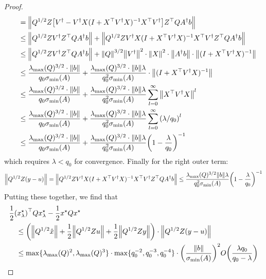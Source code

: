 \documentclass[12pt]{article}
\begin{document}
\begin{proof}
\begin{align*}
      &\quad= {\left\lVert Q^{1/2} Z
          {\left[V^\dagger
            - V^\dagger X(I + X^\top V^\dagger X)^{-1} X^\top V^\dagger\right]}
          Z^\top Q A^\dagger b\right\rVert} \\
      &\quad\leq {\left\lVert Q^{1/2} Z V ^\dagger Z^\top Q A^\dagger b\right\rVert}
        + {\left\lVert Q^{1/2} Z V^\dagger X
          (I + X^\top V^\dagger X)^{-1} X^\top V^\dagger
          Z^\top Q A^\dagger b\right\rVert} \\
      &\quad\leq {\left\lVert Q^{1/2} Z V ^\dagger Z^\top Q A^\dagger b\right\rVert}
        + {\left\lVert Q\right\rVert}^{3/2} {\left\lVert V^\dagger\right\rVert}^2 \cdot {\left\lVert X\right\rVert}^2
          \cdot {\left\lVert A^\dagger b\right\rVert}
          \cdot {\left\lVert(I + X^\top V^\dagger X)^{-1}\right\rVert} \\
      &\quad\leq
        \frac{\lambda_{\max} (Q)^{3/2} \cdot {\left\lVert b\right\rVert}}{q_0 \sigma_{\min} (A)}
        + \frac{\lambda_{\max} (Q)^{3/2} \cdot {\left\lVert b\right\rVert} \lambda}
                {q_0 ^2 \sigma_{\min} (A)}
        \cdot {\left\lVert(I + X^\top V^\dagger X)^{-1}\right\rVert} \\
      &\quad\leq
        \frac{\lambda_{\max} (Q)^{3/2} \cdot {\left\lVert b\right\rVert}}{q_0 \sigma_{\min} (A)}
        + \frac{\lambda_{\max} (Q)^{3/2} \cdot {\left\lVert b\right\rVert} \lambda}
                {q_0 ^2 \sigma_{\min} (A)}
          \sum_{l = 0}^{\infty} {\left\lVert X^\top V^\dagger X\right\rVert}^l \\
      &\quad\leq
        \frac{\lambda_{\max} (Q)^{3/2} \cdot {\left\lVert b\right\rVert}}{q_0 \sigma_{\min} (A)}
        + \frac{\lambda_{\max} (Q)^{3/2} \cdot {\left\lVert b\right\rVert} \lambda}
                {q_0 ^2 \sigma_{\min} (A)}
          \sum_{l = 0}^{\infty} {\left(\lambda / q_0\right)}^l \\
      &\quad\leq
        \frac{\lambda_{\max} (Q)^{3/2} \cdot {\left\lVert b\right\rVert}}{q_0 \sigma_{\min} (A)}
        + \frac{\lambda_{\max} (Q)^{3/2} \cdot {\left\lVert b\right\rVert} \lambda}
                {q_0 ^2 \sigma_{\min} (A)}
            {\left(1 - \frac{\lambda}{q_0}\right)}^{-1}
  \end{align*}
  which requires \(\lambda < q_0\) for convergence.
  Finally for the right outer term:
  \begin{align*}
    {\left\lVert Q^{1/2} Z (y - u)\right\rVert}
      = {\left\lVert Q^{1/2} Z V^\dagger X
        (I + X^\top V^\dagger X)^{-1} X^\top V^\dagger Z^\top Q A ^\dagger b\right\rVert}
      \leq \frac{\lambda_{\max} (Q)^{3/2} {\left\lVert b\right\rVert} \lambda}{q_0 ^2 \sigma_{\min} (A)}
      {\left(1 - \frac{\lambda}{q_0}\right)}^{-1}
  \end{align*}
  Putting these together, we find that
  \begin{align*}
    &\frac{1}{2} {\left(x_\lambda ^\star\right)}^\top Q x_\lambda ^\star
      - \frac{1}{2} x^\star Q x^\star \\
    &\quad\leq
      {\left({\left\lVert Q^{1/2} \hat{x}\right\rVert}
        + \frac{1}{2} {\left\lVert Q^{1/2} Z u\right\rVert}
        + \frac{1}{2} {\left\lVert Q^{1/2} Z y\right\rVert}\right)}
            \cdot {\left\lVert Q^{1/2} Z (y - u)\right\rVert} \\
    &\quad \leq
      \max\{\lambda_{\max} (Q)^2, \lambda_{\max} (Q)^3\}
       \cdot \max\{q_0 ^{-2}, q_0 ^{-3}, q_0 ^{-4}\}
       \cdot {\left(\frac{{\left\lVert b\right\rVert}}{\sigma_{\min} (A)}\right)}^2
       O {\left(\frac{\lambda q_0}{q_0 - \lambda}\right)}
  \end{align*}

\end{proof}
\end{document}
